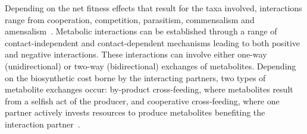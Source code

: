 \documentclass[sn-mathphys,Numbered]{sn-jnl}  %
\theoremstyle{thmstyleone}%
\theoremstyle{thmstyletwo}%
\theoremstyle{thmstylethree}%
\begin{document}
    Depending on the net fitness effects that result for the taxa involved, interactions range from cooperation, competition, parasitism, commensalism and amensalism~\cite{faust2012microbialReviewInteractions}.
    Metabolic interactions can be established through a range of contact-independent and contact-dependent mechanisms leading to both positive and negative interactions. 
    These interactions can involve either one-way (unidirectional) or two-way (bidirectional) exchanges of metabolites.
    Depending on the biosynthetic cost borne by the interacting partners, two types of metabolite exchanges occur: by-product cross-feeding, where metabolites result from a selfish act of the producer, and cooperative cross-feeding, where one partner actively invests resources to produce metabolites benefiting the interaction partner~\cite{d2018ecology}.
\end{document}
